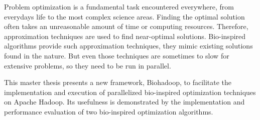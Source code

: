 Problem optimization is a fundamental task encountered everywhere, from everydays life to the most complex science areas. Finding the optimal solution often takes an unreasonable amount of time or computing resources. Therefore, approximation techniques are used to find near-optimal solutions. Bio-inspired algorithms provide such approximation techniques, they mimic existing solutions found in the nature. But even those techniques are sometimes to slow for extensive problems, so they need to be run in parallel.

This master thesis presents a new framework, Biohadoop, to facilitate the implementation and execution of parallelized bio-inspired optimization techniques on Apache Hadoop. Its usefulness is demonstrated by the implementation and performance evaluation of two bio-inspired optimization algorithms.